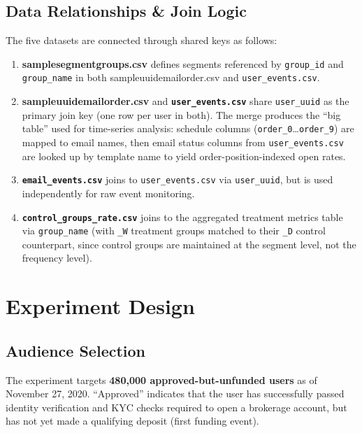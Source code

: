 \documentclass[12pt,a4paper]{article}
\newcommand{\colname}[1]{{\ttfamily\renewcommand{\_}{\textunderscore\allowbreak}#1}}
\begin{document}
\subsection{Data Relationships \& Join Logic}

The five datasets are connected through shared keys as follows:

\begin{enumerate}[leftmargin=2em]
  \item \textbf{\colname{sample\_segment\_groups.csv}} defines segments referenced by
    \texttt{group\_id} and \texttt{group\_name} in both \colname{sample\_uuid\_email\_order.csv}
    and \texttt{user\_events.csv}.
  \item \textbf{\colname{sample\_uuid\_email\_order.csv}} and \textbf{\texttt{user\_events.csv}}
    share \texttt{user\_uuid} as the primary join key (one row per user in both).
    The merge produces the ``big table'' used for time-series analysis: schedule
    columns (\texttt{order\_0}\ldots\texttt{order\_9}) are mapped to email names,
    then email status columns from \texttt{user\_events.csv} are looked up by
    template name to yield order-position-indexed open rates.
  \item \textbf{\texttt{email\_events.csv}} joins to \texttt{user\_events.csv} via
    \texttt{user\_uuid}, but is used independently for raw event monitoring.
  \item \textbf{\texttt{control\_groups\_rate.csv}} joins to the aggregated treatment
    metrics table via \texttt{group\_name} (with \texttt{\_W} treatment groups
    matched to their \texttt{\_D} control counterpart, since control groups are
    maintained at the segment level, not the frequency level).
\end{enumerate}

\clearpage
\section{Experiment Design}

\subsection{Audience Selection}

The experiment targets \textbf{480,000 approved-but-unfunded users} as of November 27,
2020. ``Approved'' indicates that the user has successfully passed identity verification
and KYC checks required to open a brokerage account, but has not yet made a qualifying
deposit (first funding event).
\end{document}
